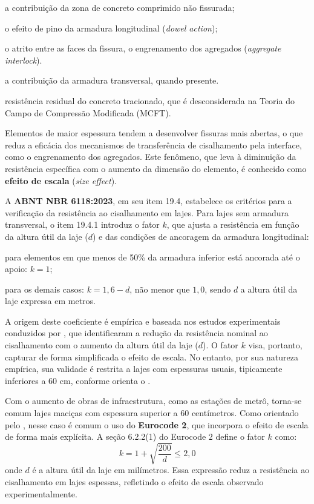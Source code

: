 \begin{alineas}
\item a contribuição da zona de concreto comprimido não fissurada;
\item o efeito de pino da armadura longitudinal (\textit{dowel action});
\item o atrito entre as faces da fissura, o engrenamento dos agregados (\textit{aggregate interlock}).
\item a contribuição da armadura transversal, quando presente.
\item resistência residual do concreto tracionado, que é desconsiderada na Teoria do Campo de Compressão Modificada (MCFT).
\end{alineas}

Elementos de maior espessura tendem a desenvolver fissuras mais abertas, o que reduz a eficácia dos mecanismos de transferência de cisalhamento pela interface, como o engrenamento dos agregados. Este fenômeno, que leva à diminuição da resistência específica com o aumento da dimensão do elemento, é conhecido como \textbf{efeito de escala} (\textit{size effect}).

A \textbf{ABNT NBR 6118:2023}, em seu item 19.4, estabelece os critérios para a verificação da resistência ao cisalhamento em lajes. Para lajes sem armadura transversal, o item 19.4.1 introduz o fator $k$, que ajusta a resistência em função da altura útil da laje ($d$) e das condições de ancoragem da armadura longitudinal:

\begin{alineas}
    \item para elementos em que menos de 50\% da armadura inferior está ancorada até o apoio: $k = 1$;
    \item para os demais casos: $k = 1{,}6 - d$, não menor que $1{,}0$, sendo $d$ a altura útil da laje expressa em metros.
\end{alineas}

A origem deste coeficiente é empírica e baseada nos  estudos experimentais conduzidos por \textcite{Hedman1975shear}, que identificaram a redução da resistência nominal ao cisalhamento com o aumento da altura útil da laje ($d$). O fator $k$ visa, portanto, capturar de forma simplificada o efeito de escala. No entanto, por sua natureza empírica, sua validade é restrita a lajes com espessuras usuais, tipicamente inferiores a 60 cm, conforme orienta o \textcite{IBRACON2020}.

Com o aumento de obras de infraestrutura, como as estações de metrô, torna-se comum lajes maciças com espessura superior a 60 centímetros. Como orientado pelo \textcite{IBRACON2020}, nesse caso é comum o uso do \textbf{Eurocode 2}, que incorpora o efeito de escala de forma mais explícita. A seção 6.2.2(1) do Eurocode 2 define o fator $k$ como:
\begin{equation}
    k = 1+ \sqrt{\frac{200}{d}} \leq 2,0
\end{equation}
onde $d$ é a altura útil da laje em milímetros. Essa expressão reduz a resistência ao cisalhamento em lajes espessas, refletindo o efeito de escala observado experimentalmente.

